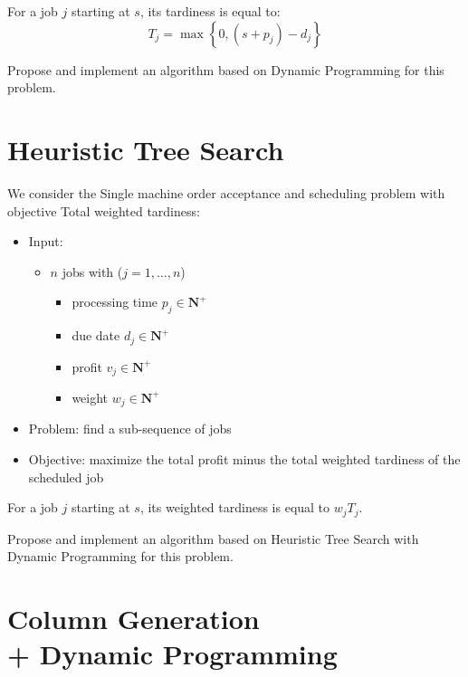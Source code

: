 \documentclass[a4paper,twocolumn]{article}
\newcommand{\N}{\mathbf{N}}
\begin{document}
For a job $j$ starting at $s$, its tardiness is equal to:
\begin{displaymath}
  T_j = \max \left\{ 0, (s + p_j) - d_j \right\}
\end{displaymath}

Propose and implement an algorithm based on Dynamic Programming for this problem.

\section{Heuristic Tree Search}

We consider the Single machine order acceptance and scheduling problem with objective Total weighted tardiness:
\begin{itemize}
  \item Input:
    \begin{itemize}
      \item $n$ jobs with ($j = 1, \dots, n$)
        \begin{itemize}
          \item processing time $p_j \in \N^+$
          \item due date $d_j \in \N^+$
          \item profit $v_j \in \N^+$
          \item weight $w_j \in \N^+$
        \end{itemize}
    \end{itemize}
  \item Problem: find a sub-sequence of jobs
  \item Objective: maximize the total profit minus the total weighted tardiness of the scheduled job
\end{itemize}

For a job $j$ starting at $s$, its weighted tardiness is equal to $w_j T_j$.

Propose and implement an algorithm based on Heuristic Tree Search with Dynamic Programming for this problem.

\section{Column Generation \\ + Dynamic Programming}
\end{document}
